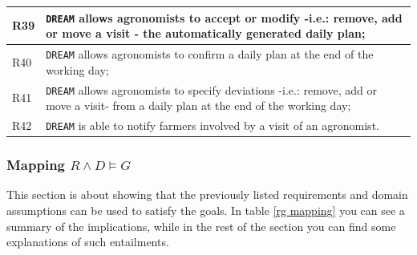 \documentclass{article}
\begin{document}
\begin{longtable}[c]{|m{0.75cm}|m{11cm}|}
  \hline
R39\label{R} & \verb|DREAM| allows agronomists to accept or modify -i.e.: remove, add or move a visit - the automatically generated daily plan;\\
  \hline
R40\label{R} & \verb|DREAM| allows agronomists to confirm a daily plan at the end of the working day; \\
  \hline
 R41\label{R} & \verb|DREAM| allows agronomists to specify deviations -i.e.: remove, add or move a visit- from a daily plan at the end of the working day; \\
  \hline
R42\label{R} & \verb|DREAM| is able to notify farmers involved by a visit of an agronomist.\\
  \hline
  \end{longtable}
  \newpage
\subsubsection{Mapping \texorpdfstring{$R \wedge D \vDash G$}{TEXT}}
This section is about showing that the previously listed requirements and domain assumptions can be used to satisfy the goals. In table \ref{rg mapping} you can see a summary of the implications, while in the rest of the section you can find some explanations of such entailments.
\end{document}
